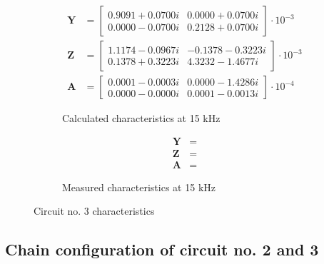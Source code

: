 \documentclass[notitlepage, a4paper, 11pt]{article}
\begin{document}
\begin{figure}[H]
		\begin{subfigure}{0.45\textwidth}
			\begin{align*}
				\mathbf{Y} &= 
				\begin{bmatrix}
					0.9091 + 0.0700i  & 0.0000 + 0.0700i \\
					0.0000 - 0.0700i  & 0.2128 + 0.0700i
				\end{bmatrix}
				\cdot 10^{-3}
				\\
				\mathbf{Z} &= 
				\begin{bmatrix}
					1.1174 - 0.0967i & -0.1378 - 0.3223i \\
					0.1378 + 0.3223i & 4.3232 - 1.4677i
				\end{bmatrix}
				\cdot 10^{-3}
				\\
				\mathbf{A} &= 
				\begin{bmatrix}
					0.0001 - 0.0003i & 0.0000 - 1.4286i \\
					0.0000 - 0.0000i & 0.0001 - 0.0013i
				\end{bmatrix}
				\cdot 10^{-4}
			\end{align*}
			\caption{Calculated characteristics at 15 kHz}
		\end{subfigure}
		\hfill
				\begin{subfigure}{0.45\textwidth}
			\begin{align*}
				\mathbf{Y} &= 
				\\
				\mathbf{Z} &= 
				\\
				\mathbf{A} &= 
			\end{align*}
			\caption{Measured characteristics at 15 kHz}
		\end{subfigure}
		\caption{Circuit no. 3 characteristics}
	\end{figure}
	
	\subsection{Chain configuration of circuit no. 2 and 3}
	
\end{document}

